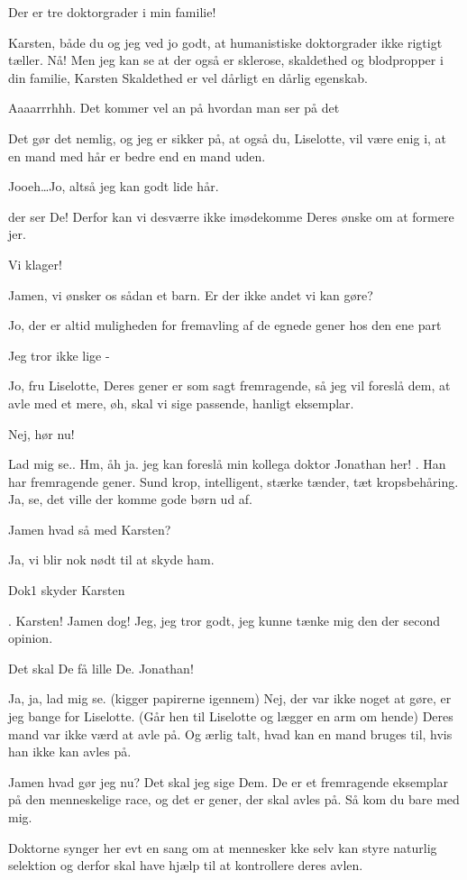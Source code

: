 \documentclass[a4paper,11pt]{article}
\begin{document}
\begin{sketch}
 Der er tre doktorgrader i min familie!

 Karsten, både du og jeg ved jo godt, at humanistiske doktorgrader ikke rigtigt tæller. Nå! Men jeg kan se at der også er sklerose, skaldethed og blodpropper i din familie, Karsten
 Skaldethed er vel dårligt en dårlig egenskab.  

 Aaaarrrhhh. Det kommer vel an på hvordan man ser på det

 Det gør det nemlig, og jeg er sikker på, at også du, Liselotte, vil være enig i, at en mand med hår er bedre end en mand uden. 


 Jooeh\ldots Jo, altså jeg kan godt lide hår.

 der ser De! Derfor kan vi desværre ikke imødekomme Deres ønske om at formere jer.

 Vi klager!

 Jamen, vi ønsker os sådan et barn. Er der ikke andet vi kan gøre?

 Jo, der er altid muligheden for fremavling af de egnede gener hos den ene part

 Jeg tror ikke lige -

 Jo, fru Liselotte, Deres gener er som sagt fremragende, så jeg vil foreslå dem, at avle med et mere, øh, skal vi sige passende, hanligt eksemplar.

 Nej, hør nu!

 Lad mig se.. Hm, åh ja. jeg kan foreslå min kollega doktor Jonathan her! . Han har fremragende gener. Sund krop, intelligent, stærke tænder, tæt kropsbehåring. Ja, se, det ville der komme gode børn ud af.

 Jamen hvad så med Karsten?

 Ja, vi blir nok nødt til at skyde ham.

\scene Dok1 skyder Karsten

. Karsten! Jamen dog! Jeg, jeg tror godt, jeg kunne tænke mig den der second opinion. 

 Det skal De få lille De. Jonathan!

 Ja, ja, lad mig se. (kigger papirerne igennem) Nej, der var ikke noget at gøre, er jeg bange for Liselotte. (Går hen til Liselotte og lægger en arm om hende) Deres mand var ikke værd at avle på. Og ærlig talt, hvad kan en mand bruges til, hvis han ikke kan avles på. 

 Jamen hvad gør jeg nu?
 Det skal jeg sige Dem. De er et fremragende eksemplar på den menneskelige race, og det er gener, der skal avles på. Så kom du bare med mig. 

Doktorne synger her evt en sang om at mennesker kke selv kan styre naturlig selektion og derfor skal have hjælp til at kontrollere deres avlen. 



\end{sketch}
\end{document}
